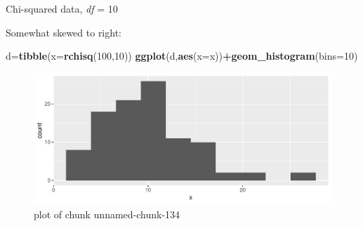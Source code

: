 \documentclass[ignorenonframetext,]{beamer}
\newenvironment{Shaded}{\begin{snugshade}}{\end{snugshade}}
\newcommand{\DataTypeTok}[1]{\textcolor[rgb]{0.13,0.29,0.53}{#1}}
\newcommand{\DecValTok}[1]{\textcolor[rgb]{0.00,0.00,0.81}{#1}}
\newcommand{\KeywordTok}[1]{\textcolor[rgb]{0.13,0.29,0.53}{\textbf{#1}}}
\newcommand{\NormalTok}[1]{#1}
\newcommand{\OperatorTok}[1]{\textcolor[rgb]{0.81,0.36,0.00}{\textbf{#1}}}
\begin{document}
\begin{frame}[fragile]{Chi-squared data, \emph{df} = 10}
\protect\hypertarget{chi-squared-data-df-10}{}

Somewhat skewed to right:

\begin{Shaded}
\begin{Highlighting}[]
\NormalTok{d=}\KeywordTok{tibble}\NormalTok{(}\DataTypeTok{x=}\KeywordTok{rchisq}\NormalTok{(}\DecValTok{100}\NormalTok{,}\DecValTok{10}\NormalTok{))}
\KeywordTok{ggplot}\NormalTok{(d,}\KeywordTok{aes}\NormalTok{(}\DataTypeTok{x=}\NormalTok{x))}\OperatorTok{+}\KeywordTok{geom_histogram}\NormalTok{(}\DataTypeTok{bins=}\DecValTok{10}\NormalTok{)}
\end{Highlighting}
\end{Shaded}

\begin{figure}
\centering
\includegraphics{figure/unnamed-chunk-134-1.pdf}
\caption{plot of chunk unnamed-chunk-134}
\end{figure}

\end{frame}
\end{document}
